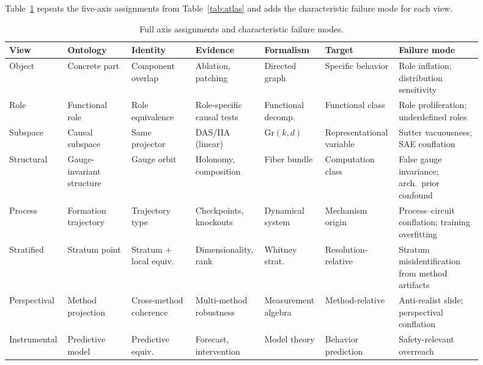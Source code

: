 \documentclass[11pt]{article}
\theoremstyle{remark}
\newcommand{\Gr}{\mathrm{Gr}}
\begin{document}
Table~\ref{tab:full} repeats the five-axis assignments from
Table~\ref{tab:atlas} and adds the characteristic failure mode for each
view.

\begin{table}[ht]
\centering
\footnotesize
\setlength{\tabcolsep}{3pt}
\begin{tabular}{p{0.09\linewidth}p{0.13\linewidth}p{0.13\linewidth}p{0.14\linewidth}p{0.12\linewidth}p{0.12\linewidth}p{0.17\linewidth}}
\toprule
\textbf{View} & \textbf{Ontology}
  & \textbf{Identity} & \textbf{Evidence}
  & \textbf{Formalism} & \textbf{Target}
  & \textbf{Failure mode} \\
\midrule
Object
  & Concrete part
  & Component overlap
  & Ablation, patching
  & Directed graph
  & Specific behavior
  & Role inflation; distribution sensitivity \\[2pt]
Role
  & Functional role
  & Role equivalence
  & Role-specific causal tests
  & Functional decomp.
  & Functional class
  & Role proliferation; underdefined roles \\[2pt]
Subspace
  & Causal subspace
  & Same projector
  & DAS/IIA (linear)
  & $\Gr(k,d)$
  & Representational variable
  & Sutter vacuousness; SAE conflation \\[2pt]
Structural
  & Gauge-invariant structure
  & Gauge orbit
  & Holonomy, composition
  & Fiber bundle
  & Computation class
  & False gauge invariance; arch.\ prior confound \\[2pt]
Process
  & Formation trajectory
  & Trajectory type
  & Checkpoints, knockouts
  & Dynamical system
  & Mechanism origin
  & Process--circuit conflation; training overfitting \\[2pt]
Stratified
  & Stratum point
  & Stratum + local equiv.
  & Dimensionality, rank
  & Whitney strat.
  & Resolution-relative
  & Stratum misidentification from method artifacts \\[2pt]
Perspectival
  & Method projection
  & Cross-method coherence
  & Multi-method robustness
  & Measurement algebra
  & Method-relative
  & Anti-realist slide; perspectival conflation \\[2pt]
Instrumental
  & Predictive model
  & Predictive equiv.
  & Forecast, intervention
  & Model theory
  & Behavior prediction
  & Safety-relevant overreach \\
\bottomrule
\end{tabular}
\caption{Full axis assignments and characteristic failure modes.}
\label{tab:full}
\end{table}
\end{document}
